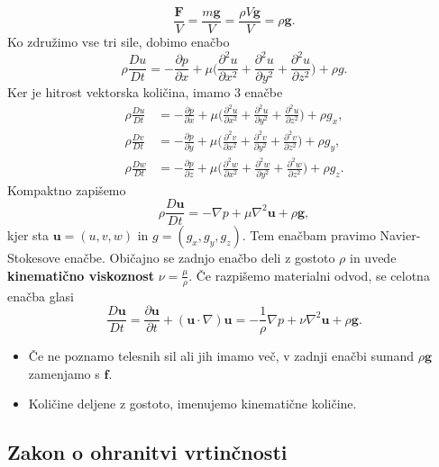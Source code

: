 \documentclass[mat2, tisk]{fmfdelo}
\newcommand{\bd}{\textbf}
\begin{document}
$$
\frac{\bd{F}}{V} = \frac{m \bd{g}}{V} = \frac{\rho V \bd{g}}{V} = \rho \bd{g}.
$$
Ko združimo vse tri sile, dobimo enačbo
$$
\rho \frac{D u}{D t} = - \frac{\partial p}{\partial x} + \mu \Big( \frac{\partial^2 u}{\partial x^2} + \frac{\partial^2 u}{\partial y^2} + \frac{\partial^2 u}{\partial z^2} \Big) + \rho g.
$$
Ker je hitrost vektorska količina, imamo $3$ enačbe 
\begin{align*}
  \rho \frac{D u}{D t} &= - \frac{\partial p}{\partial x} + \mu \Big( \frac{\partial^2 u}{\partial x^2} + \frac{\partial^2 u}{\partial y^2} + \frac{\partial^2 u}{\partial z^2} \Big) + \rho g_x,\\
  \rho \frac{D v}{D t} &= - \frac{\partial p}{\partial y} + \mu \Big( \frac{\partial^2 v}{\partial x^2} + \frac{\partial^2 v}{\partial y^2} + \frac{\partial^2 v}{\partial z^2} \Big) + \rho g_y,\\
  \rho \frac{D w}{D t} &= - \frac{\partial p}{\partial z} + \mu \Big( \frac{\partial^2 w}{\partial x^2} + \frac{\partial^2 w}{\partial y^2} + \frac{\partial^2 w}{\partial z^2} \Big) + \rho g_z.
\end{align*}
Kompaktno zapišemo 
$$
\rho \frac{D \bd{u}}{D t} = - \nabla p + \mu \nabla^2 \bd{u} + \rho \bd{g},
$$
kjer sta $\bd{u} = (u, v, w)$ in $g = (g_x, g_y, g_z)$. Tem enačbam pravimo Navier-Stokesove enačbe.
Običajno se zadnjo enačbo deli z gostoto $\rho$ in uvede \textbf{kinematično viskoznost} $\nu = \frac{\mu}{\rho}$. Če razpišemo
 materialni odvod, se celotna enačba glasi
\begin{equation}
  \label{NS}
\frac{D \bd{u}}{D t} = \frac{\partial \bd{u}}{\partial t} + (\bd{u}\cdot \nabla)\bd{u} = - \frac{1}{\rho}\nabla p + \nu \nabla^2 \bd{u} + \rho \bd{g}.
\end{equation}

\begin{opomba}
  \hfil
\begin{itemize}
  \item Če ne poznamo telesnih sil ali jih imamo več, v zadnji enačbi sumand $\rho \bd{g}$ zamenjamo s $\bd{f}$.
  \item Količine deljene z gostoto, imenujemo kinematične količine.
\end{itemize}
\end{opomba}

\subsection{Zakon o ohranitvi vrtinčnosti}
\end{document}

